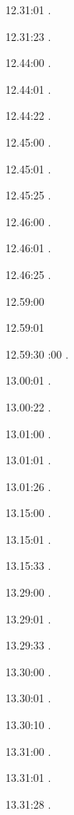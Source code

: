 \documentclass[italian]{article}
\begin{document}
12.31:01    .

12.31:23    .

12.44:00    .

12.44:01    .

12.44:22    .

12.45:00    .

12.45:01    .

12.45:25    .

12.46:00    .

12.46:01    .

12.46:25    .

12.59:00    

12.59:01    

12.59:30    
:00    . 

13.00:01    . 

13.00:22    . 

13.01:00     . 

13.01:01     . 

13.01:26     . 

13.15:00     . 

13.15:01     .

13.15:33     .

13.29:00     . 

13.29:01     . 

13.29:33     . 

13.30:00     .

13.30:01     .

13.30:10     .

13.31:00     .

13.31:01     .

13.31:28     .
\end{document}
